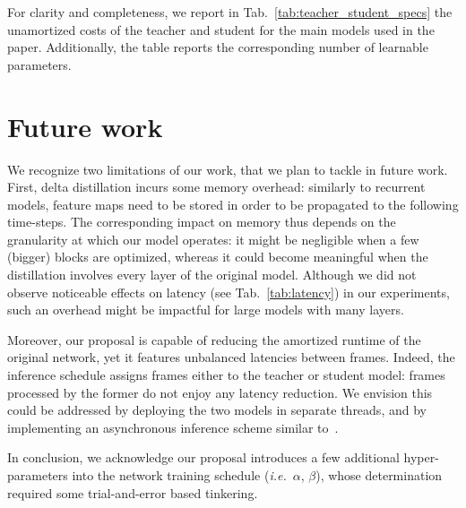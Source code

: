\documentclass[runningheads]{llncs}
\newcommand{\closesupplement}{
    \renewcommand\thesection{\arabic{section}}
}
\begin{document}
For clarity and completeness, we report in Tab.~\ref{tab:teacher_student_specs} the unamortized costs of the teacher and student for the main models used in the paper.
Additionally, the table reports the corresponding number of learnable parameters. \section{Future work}
We recognize two limitations of our work, that we plan to tackle in future work.
First, delta distillation incurs some memory overhead: similarly to recurrent models, feature maps need to be stored in order to be propagated to the following time-steps.
The corresponding impact on memory thus depends on the granularity at which our model operates: it might be negligible when a few (bigger) blocks are optimized, whereas it could become meaningful when the distillation involves every layer of the original model.
Although we did not observe noticeable effects on latency (see Tab.~\ref{tab:latency}) in our experiments, such an overhead might be impactful for large models with many layers.

Moreover, our proposal is capable of reducing the amortized runtime of the original network, yet it features unbalanced latencies between frames.
Indeed, the inference schedule assigns frames either to the teacher or student model: frames processed by the former do not enjoy any latency reduction.
We envision this could be addressed by deploying the two models in separate threads, and by implementing an asynchronous inference scheme similar to~\cite{liu2019looking}.

In conclusion, we acknowledge our proposal introduces a few additional hyper-parameters into the network training schedule (\emph{i.e.}~$\alpha$, $\beta$), whose determination required some trial-and-error based tinkering.
\end{document}
